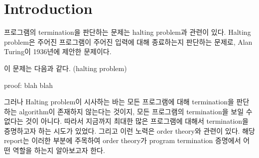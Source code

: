 \section{Introduction}
\label{sec:preliminaries}
프로그램의 termination을 판단하는 문제는 halting problem과 관련이 있다.
Halting problem은 주어진 프로그램이 주어진 입력에 대해 종료하는지 판단하는 문제로, Alan Turing이 1936년에 제안한 문제이다.

이 문제는 다음과 같다.
(halting problem)

proof: blah blah

그러나 Halting problem이 시사하는 바는 모든 프로그램에 대해 termination을 판단하는 algorithm이 존재하지 않는다는 것이지, 모든 프로그램의 termination을 보일 수 없다는 것이 아니다.
따라서 지금까지 최대한 많은 프로그램에 대해서 termination을 증명하고자 하는 시도가 있었다.
그리고 이런 노력은 order theory와 관련이 있다.
해당 report는 이러한 부분에 주목하여 order theory가 program termination 증명에서 어떤 역할을 하는지 알아보고자 한다.